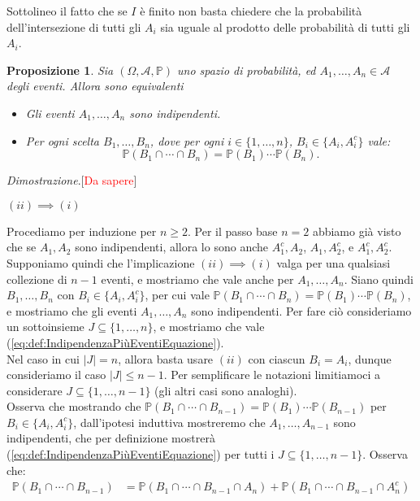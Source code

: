 \documentclass[11pt]{book}
\makeatletter
\theoremstyle{Definizione}
\theoremstyle{TeoremaProposizioneLemmaCorollario}
\newtheorem{mypropo}[myteo]{Proposizione}
\theoremstyle{OsservazioneNota}
\renewenvironment{proof}[1][\proofname]{\par
  \normalfont \topsep6\p@\@plus6\p@\relax
  \trivlist
  \item[\hskip\labelsep
        \itshape
    #1\@addpunct{.}]\ignorespaces
}{%
  \endtrivlist\@endpefalse
}
\renewcommand{\P}{\mathbb{P}}
\renewenvironment{proof}{\textsl{Dimostrazione}.}{}
\makeatother
\begin{document}
Sottolineo il fatto che se $I$ è finito non basta chiedere che la probabilità dell'intersezione di tutti gli $A_i$ sia uguale al prodotto delle probabilità di tutti gli $A_i$.
\begin{boxpro}
\begin{mypropo}\label{pro:EventiIndipendentiEquivalenza}
Sia $(\Omega,\mathcal{A},\P)$ uno spazio di probabilità, ed $A_1,\dots,A_n\in \mathcal{A}$ degli eventi. Allora sono equivalenti
\begin{itemize}
\item[$(i)$] Gli eventi $A_1,\dots,A_n$ sono indipendenti.
\item[$(ii)$] Per ogni scelta $B_1,\dots,B_n$, dove per ogni $i\in \{1,\dots,n\}$, $B_i\in \{A_i,A_i^c\}$ vale:
$$
\P(B_1\cap \cdots \cap B_n) = \P(B_1) \cdots \P(B_n).
$$
\end{itemize}
\end{mypropo}
\tcblower
\begin{proof}[\textcolor{red}{Da sapere}]
\hfill
\begin{flushleft}
$(ii) \implies (i)$
\end{flushleft}
Procediamo per induzione per $n \geq 2$. Per il passo base $n = 2$ abbiamo già visto che se $A_1,A_2$ sono indipendenti, allora lo sono anche $A_1^c,A_2$, $A_1,A_2^c$, e $A_1^c,A_2^c$. Supponiamo quindi che l'implicazione $(ii)\implies (i)$ valga per una qualsiasi collezione di $n-1$ eventi, e mostriamo che vale anche per $A_1,\dots,A_n$. Siano quindi $B_1,\dots,B_n$ con $B_i\in \{A_i,A_i^c\}$, per cui vale $\P(B_1\cap \cdots \cap B_n) = \P(B_1)\cdots \P(B_n)$, e mostriamo che gli eventi $A_1,\dots,A_n$ sono indipendenti. Per fare ciò consideriamo un sottoinsieme $J \subseteq\{1,\dots,n\}$, e mostriamo che vale (\ref{eq:def:IndipendenzaPiùEventiEquazione}).\\
Nel caso in cui $|J| = n$, allora basta usare $(ii)$ con ciascun $B_i = A_i$, dunque consideriamo il caso $|J| \leq n-1$. Per semplificare le notazioni limitiamoci a considerare $J \subseteq \{1,\dots,n-1\}$ (gli altri casi sono analoghi).\\
Osserva che mostrando che $\P(B_1\cap \cdots \cap B_{n-1}) = \P(B_1)\cdots \P(B_{n-1})$ per $B_i\in \{A_i,A_i^c\}$, dall'ipotesi induttiva mostreremo che $A_1,\dots,A_{n-1}$ sono indipendenti, che per definizione mostrerà (\ref{eq:def:IndipendenzaPiùEventiEquazione}) per tutti i $J\subseteq \{1,\dots,n-1\}$. Osserva che:
\begin{align*}
\P(B_1\cap \cdots \cap B_{n-1}) &= \P(B_1\cap \cdots \cap B_{n-1} \cap A_n) + \P(B_1 \cap \cdots \cap B_{n-1}\cap A_n^c)\\

\end{align*}
\end{proof}
\end{boxpro}
\end{document}
